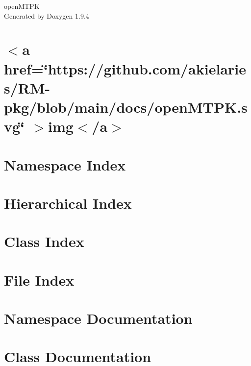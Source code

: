 \documentclass[twoside]{book}
\newcommand{\+}{\discretionary{\mbox{\scriptsize$\hookleftarrow$}}{}{}}
\newcommand{\clearemptydoublepage}{%
    \newpage{\pagestyle{empty}\cleardoublepage}%
  }
\begin{document}
  \raggedbottom
    \hypersetup{pageanchor=false,
                bookmarksnumbered=true,
                pdfencoding=unicode
               }
  \begin{titlepage}
  \vspace*{7cm}
  \begin{center}%
  {\Large open\+MTPK}\\
  \vspace*{1cm}
  {\large Generated by Doxygen 1.9.4}\\
  \end{center}
  \end{titlepage}
  \clearemptydoublepage
  \tableofcontents
  \clearemptydoublepage
  \hypersetup{pageanchor=true}
\chapter{\texorpdfstring{$<$}{<}a href=\char`\"{}https\+://github.\+com/akielaries/\+RM-\/pkg/blob/main/docs/open\+MTPK.\+svg\char`\"{} \texorpdfstring{$>$}{>}img\texorpdfstring{$<$}{<}/a\texorpdfstring{$>$}{>}}
\label{index}\hypertarget{index}{}
\chapter{Namespace Index}

\chapter{Hierarchical Index}

\chapter{Class Index}

\chapter{File Index}

\chapter{Namespace Documentation}

\chapter{Class Documentation}





















\end{document}
